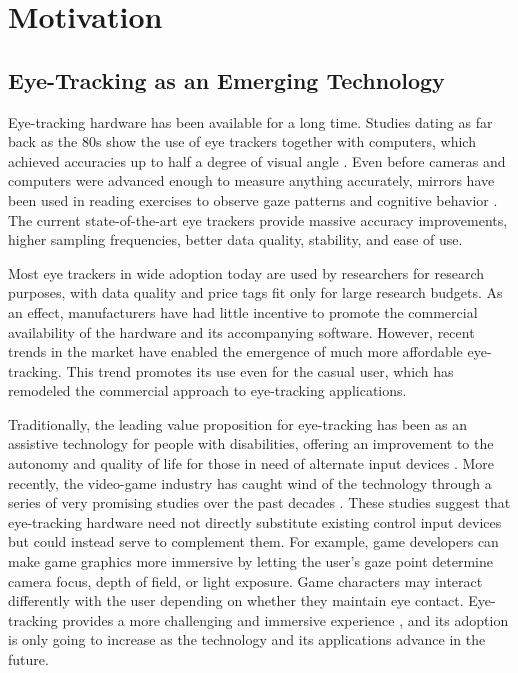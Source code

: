 \section{Motivation} \label{sec:intro/motivation}

\subsection{Eye-Tracking as an Emerging Technology} \label{sec:intro/motivation/eye_tracking}

Eye-tracking hardware has been available for a long time. Studies dating as far back as the 80s show the use of eye trackers together with computers, which achieved accuracies up to half a degree of visual angle \cite{colin1986}. Even before cameras and computers were advanced enough to measure anything accurately, mirrors have been used in reading exercises to observe gaze patterns and cognitive behavior \cite{vanGog2013}. The current state-of-the-art eye trackers provide massive accuracy improvements, higher sampling frequencies, better data quality, stability, and ease of use.

Most eye trackers in wide adoption today are used by researchers for research purposes, with data quality and price tags fit only for large research budgets. As an effect, manufacturers have had little incentive to promote the commercial availability of the hardware and its accompanying software. However, recent trends in the market have enabled the emergence of much more affordable eye-tracking. 
This trend promotes its use even for the casual user, which has remodeled the commercial approach to eye-tracking applications.

Traditionally, the leading value proposition for eye-tracking has been as an assistive technology for people with disabilities, offering an improvement to the autonomy and quality of life for those in need of alternate input devices \cite{barry1994, corno2002}. More recently, the video-game industry has caught wind of the technology through a series of very promising studies over the past decades \cite{leyba2004, smith2006, tobii2017}. These studies suggest that eye-tracking hardware need not directly substitute existing control input devices but could instead serve to complement them. For example, game developers can make game graphics more immersive by letting the user's gaze point determine camera focus, depth of field, or light exposure. Game characters may interact differently with the user depending on whether they maintain eye contact. Eye-tracking provides a more challenging and immersive experience \cite{antunes2018}, and its adoption is only going to increase as the technology and its applications advance in the future.


